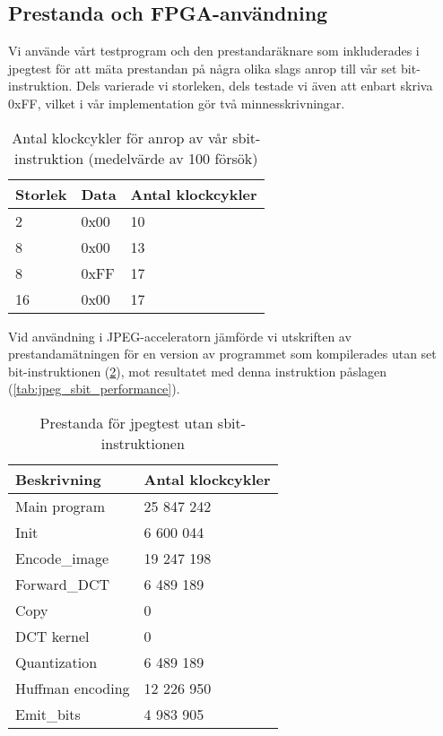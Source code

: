 \documentclass[a4paper]{article}
\begin{document}
\subsection{Prestanda och FPGA-användning}
Vi använde vårt testprogram och den prestandaräknare som inkluderades i jpegtest för att mäta prestandan på
några olika slags anrop till vår set bit-instruktion. Dels varierade vi storleken, dels testade vi
även att enbart skriva 0xFF, vilket i vår implementation gör två minnesskrivningar.\\

\begin{table}[ht]
    \centering
    \begin{tabular}{l l l}
        Storlek &  Data  &   Antal klockcykler\\
        \hline
        2       &  0x00  &   10\\
        8       &  0x00  &   13\\
        8       &  0xFF  &   17\\
        16      &  0x00  &   17\\
    \end{tabular}
    \caption{ Antal klockcykler för anrop av vår sbit-instruktion (medelvärde av 100 försök) }
    \label{tab:sbit_performance}
\end{table}

Vid användning i JPEG-acceleratorn jämförde vi utskriften av prestandamätningen för en version av
programmet som kompilerades utan set bit-instruktionen (\ref{tab:jpeg_sw_performance}), mot resultatet med denna instruktion påslagen (\ref{tab:jpeg_sbit_performance}).

\begin{table}[ht]
    \centering
    \begin{tabular}{l l}
        Beskrivning & Antal klockcykler\\
        \hline
        Main program  & 25 847 242 \\
        Init  &  6 600 044 \\
        Encode\_image  & 19 247 198 \\
        Forward\_DCT  & 6 489 189 \\
        Copy  & 0 \\
        DCT kernel  & 0 \\
        Quantization  & 6 489 189 \\
        Huffman encoding  & 12 226 950 \\
        Emit\_bits  &  4 983 905 \\
    \end{tabular}
    \caption{ Prestanda för jpegtest utan sbit-instruktionen }
    \label{tab:jpeg_sw_performance}
\end{table}
\end{document}
